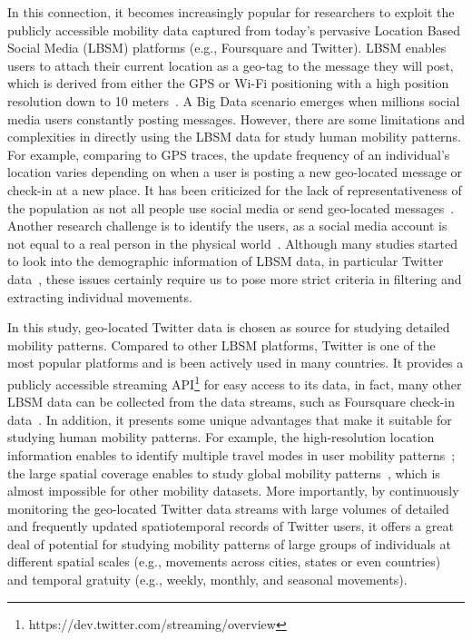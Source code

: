 \documentclass[a4paper, 11pt]{article}
\begin{document}
In this connection, it becomes increasingly popular for researchers to exploit the publicly accessible mobility data captured from today's pervasive Location Based Social Media (LBSM) platforms (e.g., Foursquare and Twitter). 
LBSM enables users to attach their current location as a geo-tag to the message they will post, which is derived from either the GPS or Wi-Fi positioning with a high position resolution down to 10 meters~\citep{Jurdak2015}.
A Big Data scenario emerges when millions social media users constantly posting messages.
However, there are some limitations and complexities in directly using the LBSM data for study human mobility patterns. 
For example, comparing to GPS traces, the update frequency of an individual's location varies depending on when a user is posting a new geo-located message or check-in at a new place. It has been criticized for the lack of representativeness of the population as not all people use social media or send geo-located messages~\citep{kung2014exploring}. Another research challenge is to identify the users, as a social media account is not equal to a real person in the physical world~\citep{tsou2015}.
Although many studies started to look into the demographic information of LBSM data, in particular Twitter data~\citep{mitchell2013geography,longley2015geotemporal}, these issues certainly require us to pose more strict criteria in filtering and extracting individual movements.

In this study, geo-located Twitter data is chosen as source for studying detailed mobility patterns. Compared to other LBSM platforms, Twitter is one of the most popular platforms and is been actively used in many countries. It provides a publicly accessible streaming API\footnote{https://dev.twitter.com/streaming/overview} for easy access to its data, in fact, many other LBSM data can be collected from the data streams, such as Foursquare check-in data~\citep{cranshaw2012livehoods, hasan2013understanding}.
In addition, it presents some unique advantages that make it suitable for studying human mobility patterns.
For example, the high-resolution location information enables to identify multiple travel modes in user mobility patterns~\citep{Jurdak2015}; the large spatial coverage enables to study global mobility patterns~\citep{hawelka2014geo}, which is almost impossible for other mobility datasets.
More importantly, by continuously monitoring the geo-located Twitter data streams with large volumes of detailed and frequently updated spatiotemporal  records of Twitter users, it offers a great deal of potential for studying mobility patterns of large groups of individuals at different spatial scales (e.g., movements across cities, states or even countries) and temporal gratuity (e.g., weekly, monthly, and seasonal movements).
\end{document}

